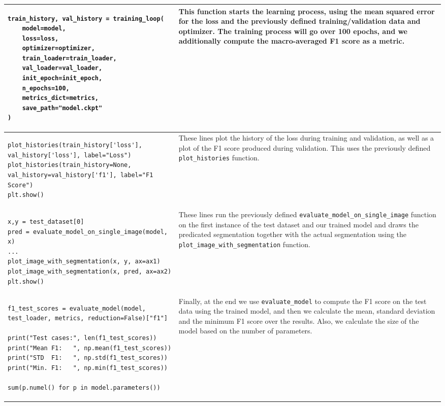 \begin{longtable}{|m{}|m{}|}
\begin{lstlisting}
train_history, val_history = training_loop(
    model=model,
    loss=loss,
    optimizer=optimizer,
    train_loader=train_loader,
    val_loader=val_loader,
    init_epoch=init_epoch,
    n_epochs=100,
    metrics_dict=metrics,
    save_path="model.ckpt"
)
\end{lstlisting} & This function starts the learning process, using the mean squared error for the loss and the previously defined training/validation data and optimizer. The training process will go over 100 epochs, and we additionally compute the macro-averaged F1 score as a metric. 
\\ \hline
\begin{lstlisting}
plot_histories(train_history['loss'], val_history['loss'], label="Loss")
plot_histories(train_history=None, val_history=val_history['f1'], label="F1 Score")
plt.show()
\end{lstlisting} & These lines plot the history of the loss during training and validation, as well as a plot of the F1 score produced during validation. This uses the previously defined \lstinline|plot_histories| function.
\\ \hline
\begin{lstlisting}
x,y = test_dataset[0]
pred = evaluate_model_on_single_image(model, x)
...
plot_image_with_segmentation(x, y, ax=ax1)
plot_image_with_segmentation(x, pred, ax=ax2)
plt.show()
\end{lstlisting} & These lines run the previously defined \lstinline|evaluate_model_on_single_image| function on the first instance of the test dataset and our trained model and draws the predicated segmentation together with the actual segmentation using the \lstinline|plot_image_with_segmentation| function. 
\\ \hline
\begin{lstlisting}
f1_test_scores = evaluate_model(model, test_loader, metrics, reduction=False)["f1"]

print("Test cases:", len(f1_test_scores))
print("Mean F1:   ", np.mean(f1_test_scores))
print("STD  F1:   ", np.std(f1_test_scores))
print("Min. F1:   ", np.min(f1_test_scores))

sum(p.numel() for p in model.parameters())
\end{lstlisting} & Finally, at the end we use \lstinline|evaluate_model| to compute the F1 score on the test data using the trained model, and then we calculate the mean, standard deviation and the minimum F1 score over the results. Also, we calculate the size of the model based on the number of parameters. 
\\ \hline
\end{longtable}
\normalsize
